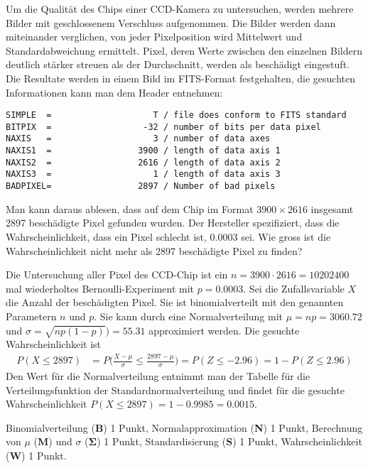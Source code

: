 Um die Qualität des Chips einer CCD-Kamera zu untersuchen, werden mehrere
Bilder mit geschlossenem Verschluss aufgenommen.
Die Bilder werden dann miteinander verglichen, von jeder Pixelposition
wird Mittelwert und Standardabweichung ermittelt.
Pixel, deren Werte zwischen den einzelnen Bildern deutlich stärker streuen
als der Durchschnitt, werden als beschädigt eingestuft.
Die Resultate werden in einem Bild im FITS-Format festgehalten, die
gesuchten Informationen kann man dem Header entnehmen:
\begin{verbatim}
SIMPLE  =                    T / file does conform to FITS standard
BITPIX  =                  -32 / number of bits per data pixel
NAXIS   =                    3 / number of data axes
NAXIS1  =                 3900 / length of data axis 1
NAXIS2  =                 2616 / length of data axis 2
NAXIS3  =                    1 / length of data axis 3
BADPIXEL=                 2897 / Number of bad pixels  
\end{verbatim}
Man kann daraus ablesen, dass auf dem Chip im Format
$3900\times 2616$ insgesamt 2897 beschädigte Pixel gefunden wurden.
Der Hersteller spezifiziert, dass die Wahrscheinlichkeit, dass ein Pixel
schlecht ist, $0.0003$ sei.
Wie gross ist die Wahrscheinlichkeit nicht mehr als 2897 beschädigte Pixel
zu finden?

\begin{loesung}
Die Untersuchung aller Pixel des CCD-Chip ist ein $n=3900\cdot2616=10202400$
mal wiederholtes Bernoulli-Experiment mit $p=0.0003$.
Sei die Zufallsvariable $X$ die Anzahl der beschädigten Pixel.
Sie ist binomialverteilt mit den genannten Parametern $n$ und $p$.
Sie kann durch eine Normalverteilung mit $\mu = np = 3060.72$
und $\sigma = \sqrt{np(1-p)})=55.31$ approximiert werden.
Die gesuchte Wahrscheinlichkeit ist
\begin{align*}
P(X\le 2897)
&=
P\biggl(
\frac{X-\mu}{\sigma}\le\frac{2897-\mu}{\sigma}
\biggr)
=
P(Z\le -2.96)
=
1-P(Z\le 2.96)
\end{align*}
Den Wert für die Normalverteilung entnimmt man der Tabelle für die
Verteilungsfunktion der Standardnormalverteilung und findet für die
gesuchte Wahrscheinlichkeit
$P(X\le 2897) = 1-0.9985=0.0015$.
\end{loesung}

\begin{bewertung}
Binomialverteilung ({\bf B}) 1 Punkt,
Normalapproximation ({\bf N}) 1 Punkt,
Berechnung von $\mu$ ({\bf M}) und $\sigma$ ($\mathbf{\Sigma}$) 1 Punkt,
Standardisierung ({\bf S}) 1 Punkt,
Wahrscheinlichkeit ({\bf W}) 1 Punkt.
\end{bewertung}


